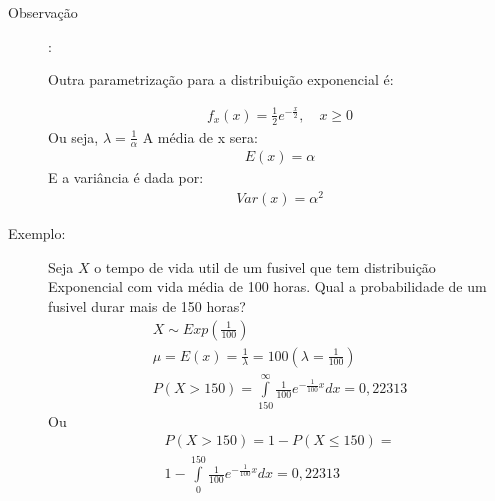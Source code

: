 \begin{description}
        \begin{description}
      \item        [Observação]:

        Outra parametrização para a distribuição exponencial é:

        \begin{align*}
          f_{x} (x)= \frac{1}{2}e^{-\frac{x}{2}}, \quad x\ge 0
        \end{align*}
        Ou seja, $\lambda= \frac{1}{\alpha}$
        A média de x sera:
        \begin{align*}
          E(x)  = \alpha
        \end{align*}
        E a variância é dada por:
        \begin{align*}
          Var(x) = \alpha^2
        \end{align*}
      \item [Exemplo:] Seja $X$ o tempo de vida util de um fusivel que tem distribuição Exponencial
        com vida média de 100 horas. Qual a probabilidade de um fusivel durar mais de 150
        horas?
        \begin{align*}
          X \sim  Exp(\frac{1}{100}) \\
          \mu = E(x)= \frac{1}{\lambda}=100 \left( \lambda= \frac{1}{100} \right)\\
          P(X> 150)= \int \limits_{150}^{\infty} \frac{1}{100} e^{- \frac{1}{100} x} dx =0,22313
        \end{align*}
        Ou 
        \begin{align*}
          P(X>150) = 1- P(X \le 150)=\\ 1- \int \limits_{0}^{150} \frac{1}{100} e^{- \frac{1}{100}x}dx          = 0,22313
        \end{align*}
      \end{description}
\end{description}
